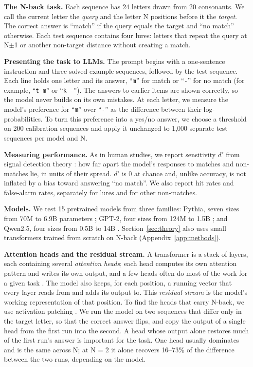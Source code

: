 \documentclass{article}
\newcommand{\dprime}{$d'$}
\begin{document}
\textbf{The N-back task.} Each sequence has 24 letters drawn from 20 consonants. We call the current letter the \emph{query} and the letter N positions before it the \emph{target}. The correct answer is ``match'' if the query equals the target and ``no match'' otherwise. Each test sequence contains four lures: letters that repeat the query at N$\pm$1 or another non-target distance without creating a match.

\textbf{Presenting the task to LLMs.} The prompt begins with a one-sentence instruction and three solved example sequences, followed by the test sequence. Each line holds one letter and its answer, ``\texttt{m}'' for match or ``\texttt{-}'' for no match (for example, ``\texttt{t m}'' or ``\texttt{k -}''). The answers to earlier items are shown correctly, so the model never builds on its own mistakes. At each letter, we measure the model's preference for ``\texttt{m}'' over ``\texttt{-}'' as the difference between their log-probabilities. To turn this preference into a yes/no answer, we choose a threshold on 200 calibration sequences and apply it unchanged to 1,000 separate test sequences per model and N.

\textbf{Measuring performance.} As in human studies, we report sensitivity \dprime{} from signal detection theory \citep{hautus1995corrections}: how far apart the model's responses to matches and non-matches lie, in units of their spread. \dprime{} is 0 at chance and, unlike accuracy, is not inflated by a bias toward answering ``no match''. We also report hit rates and false-alarm rates, separately for lures and for other non-matches.

\textbf{Models.} We test 15 pretrained models from three families: Pythia, seven sizes from 70M to 6.9B parameters \citep{biderman2023pythia}; GPT-2, four sizes from 124M to 1.5B \citep{radford2019gpt2}; and Qwen2.5, four sizes from 0.5B to 14B \citep{qwen2025qwen25}. Section~\ref{sec:theory} also uses small transformers trained from scratch on N-back (Appendix~\ref{app:methods}).

\textbf{Attention heads and the residual stream.} A transformer is a stack of layers, each containing several \emph{attention heads}; each head computes its own attention pattern and writes its own output, and a few heads often do most of the work for a given task \citep{elhage2021framework,olsson2022induction,wu2024retrieval}. The model also keeps, for each position, a running vector that every layer reads from and adds its output to. This \emph{residual stream} is the model's working representation of that position. To find the heads that carry N-back, we use activation patching \citep{zhang2024patching}. We run the model on two sequences that differ only in the target letter, so that the correct answer flips, and copy the output of a single head from the first run into the second. A head whose output alone restores much of the first run's answer is important for the task. One head usually dominates and is the same across N; at N = 2 it alone recovers 16--73\% of the difference between the two runs, depending on the model.
\end{document}

